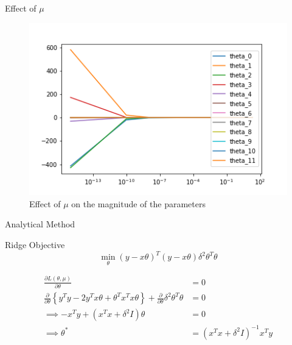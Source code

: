 \documentclass{beamer}
\begin{document}
\begin{frame}{Effect of $\mu$}
\begin{figure}
\includegraphics[width=\linewidth]{ridge/rid_reg.png}
\vspace{-0.8cm}
\caption{Effect of $\mu$ on the magnitude of the parameters}
\end{figure}
\end{frame}

\begin{frame}{Analytical Method}
\begin{tcolorbox}{Ridge Objective}
\vspace{-0.4cm}
$$
\min_\theta \left(y-x\theta\right)^T\left(y-x\theta\right)\delta^2\theta^T\theta
$$
\end{tcolorbox}
\begin{align*}
\frac{\partial L\left(\theta, \mu\right)}{\partial \theta} &= 0 \\ 
\frac{\partial}{\partial \theta}\left\lbrace y^Ty - 2y^Tx\theta + \theta^Tx^Tx\theta \right\rbrace + \frac{\partial}{\partial \theta} \delta^2\theta^T\theta &= 0 \\
\implies -x^Ty + \left(x^Tx + \delta^2I\right)\theta &= 0 \\
\implies \theta^* &= \left(x^Tx + \delta^2I\right)^{-1}x^Ty
\end{align*}
\end{frame}
\end{document}
